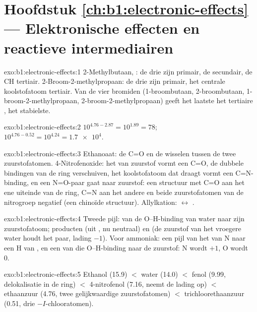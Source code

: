 \section*{Hoofdstuk \ref{ch:b1:electronic-effects} --- Elektronische effecten en reactieve intermediairen}

\begin{solution}{exo:b1:electronic-effects:1}
2-Methylbutaan, : de drie  zijn primair,
de  secundair, de CH tertiair. 2-Broom-2-methylpropaan: de drie
 zijn primair, het centrale koolstofatoom tertiair. Van de vier
bromiden  (1-broombutaan, 2-broombutaan,
1-broom-2-methylpropaan, 2-broom-2-methylpropaan) geeft het laatste het
tertiaire , het stabielste.
\end{solution}

\begin{solution}{exo:b1:electronic-effects:2}
$10^{4.76 - 2.87} = 10^{1.89} = 78$; $10^{4.76 - 0.52} = 10^{4.24} =
\num{1.7e4}$.
\end{solution}


\begin{solution}{exo:b1:electronic-effects:3}
Ethanoaat: de C=O en de  wisselen tussen de twee
zuurstofatomen. 4-Nitrofenoxide: het  van zuurstof vormt een
C=O, de dubbele bindingen van de ring verschuiven, het koolstofatoom dat
 draagt vormt een C=N-binding, en een N=O-paar gaat naar zuurstof:
een structuur met C=O aan het ene uiteinde van de ring, C=N aan het
andere en beide zuurstofatomen van de nitrogroep negatief (een chinoïde
structuur). Allylkation:
 $\leftrightarrow$ .
\end{solution}

\begin{solution}{exo:b1:electronic-effects:4}
Tweede pijl: van de O--H-binding van water naar zijn zuurstofatoom;
producten  (uit , nu neutraal) en  (de zuurstof
van het vroegere water houdt het paar, lading $-1$). Voor ammoniak: een
pijl van het  van N naar een H van , en een van die
O--H-binding naar de zuurstof: N wordt $+1$, O wordt 0.
\end{solution}

\begin{solution}{exo:b1:electronic-effects:5}
Ethanol (15.9) $<$ water (14.0) $<$ fenol (9.99, delokalisatie in de
ring) $<$ 4-nitrofenol (7.16,  neemt de lading op) $<$
ethaanzuur (4.76, twee gelijkwaardige zuurstofatomen) $<$
trichloorethaanzuur (0.51, drie $-I$-chlooratomen).
\end{solution}

